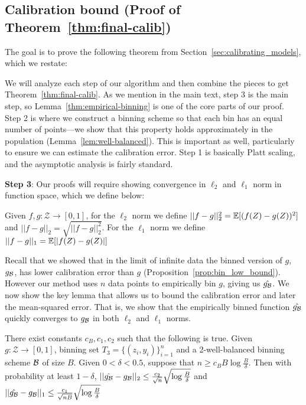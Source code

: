 
\subsection{Calibration bound (Proof of Theorem~\ref{thm:final-calib})}

The goal is to prove the following theorem from Section~\ref{sec:calibrating_models}, which we restate:

\finalCalib*{}


We will analyze each step of our algorithm and then combine the pieces to get Theorem~\ref{thm:final-calib}.
As we mention in the main text, step 3 is the main step, so Lemma~\ref{thm:empirical-binning} is one of the core parts of our proof.
Step 2 is where we construct a binning scheme so that each bin has an equal number of points---we show that this property holds approximately in the population (Lemma~\ref{lem:well-balanced}).
This is important as well, particularly to ensure we can estimate the calibration error.
Step 1 is basically Platt scaling, and the asymptotic analysis is fairly standard.

\textbf{Step 3}: Our proofs will require showing convergence in $\ell_2$ and $\ell_1$ norm in function space, which we define below:

\begin{definition}
Given $f, g : \mathcal{Z} \to [0, 1]$, for the $\ell_2$ norm we define $||f - g||_2^2 = \mathbb{E}[(f(Z) - g(Z))^2]$ and $||f- g||_2 = \sqrt{||f - g||_2^2}$. For the $\ell_1$ norm we define $||f - g||_1 = \mathbb{E}[\lvert f(Z) - g(Z)\rvert]$
\end{definition}

Recall that we showed that in the limit of infinite data the binned version of $g$, $g_{\mathcal{B}{}}$, has lower calibration error than $g$ (Proposition~\ref{prop:bin_low_bound}). However our method uses $n$ data points to empirically bin $g$, giving us $\hat{g_{\mathcal{B}{}}}$. We now show the key lemma that allows us to bound the calibration error and later the mean-squared error. That is, we show that the empirically binned function $\hat{g_{\mathcal{B}{}}}$ quickly converges to $g_{\mathcal{B}{}}$ in both $\ell_2$ and $\ell_1$ norms.

\begin{lemma}
\label{thm:empirical-binning}
There exist constants $c_B, c_1, c_2$ such that the following is true. Given $g : \mathcal{Z} \to [0, 1]$, binning set $T_3 = \{(z_i, y_i)\}_{i=1}^n$ and a 2-well-balanced binning scheme $\mathcal{B}{}$ of size $B$. Given $0 < \delta < 0.5$, suppose that $n \geq c_B B\log{\frac{B}{\delta}}$. Then with probability at least $1 - \delta$,  $||\hat{g_{\mathcal{B}{}}} - g_{\mathcal{B}{}}||_2 \leq \frac{c_2}{\sqrt{n}}\sqrt{\log{\frac{B}{\delta}}}$ and $||\hat{g_{\mathcal{B}{}}} - g_{\mathcal{B}{}}||_1 \leq \frac{c_1}{\sqrt{nB}}\sqrt{\log{\frac{B}{\delta}}}$
\end{lemma}

